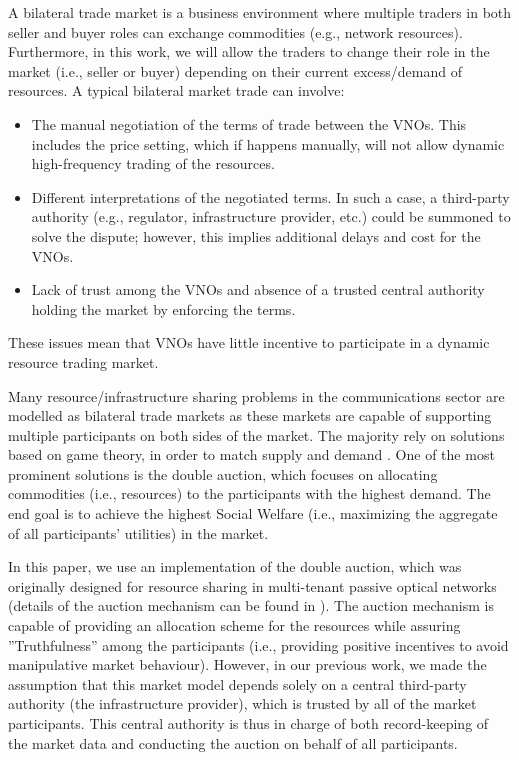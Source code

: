 \documentclass[conference]{IEEEtran}
\begin{document}
A bilateral trade market is a business environment where multiple traders in both seller and buyer roles can exchange commodities (e.g., network resources). Furthermore, in this work, we will allow the traders to change their role in the market (i.e., seller or buyer) depending on their current excess/demand of resources.
A typical bilateral market trade can involve: 
\begin{itemize}
    \item The manual negotiation of the terms of trade between the VNOs. This includes the price setting, which if happens manually, will not allow dynamic high-frequency trading of the resources.
    \item Different interpretations of the negotiated terms. In such a case, a third-party authority (e.g., regulator, infrastructure provider, etc.) could be summoned to solve the dispute; however, this implies additional delays and cost for the VNOs.
    \item Lack of trust among the VNOs and absence of a trusted central authority holding the market by enforcing the terms. 
\end{itemize}

These issues mean that VNOs have little incentive to participate in a dynamic resource trading market.


Many resource/infrastructure sharing problems in the communications sector are modelled as bilateral trade markets as these markets are capable of supporting multiple participants on both sides of the market. The majority rely on solutions based on game theory, in order to match supply and demand \cite{8542782,8665886,8664672,8395445,8488596}. One of the most prominent solutions is the double auction, which focuses on allocating commodities (i.e., resources) to the participants with the highest demand. The end goal is to achieve the highest Social Welfare (i.e., maximizing the aggregate of all participants' utilities) in the market. 

In this paper, we use an implementation of the double auction, which was originally designed for resource sharing in multi-tenant passive optical networks (details of the auction mechanism can be found in \cite{8488596}). The auction mechanism is capable of providing an allocation scheme for the resources while assuring ''Truthfulness'' among the participants (i.e., providing positive incentives to avoid manipulative market behaviour). However, in our previous work, we made the assumption that this market model depends solely on a central third-party authority (the infrastructure provider), which is trusted by all of the market participants. This central authority is thus in charge of both record-keeping of the market data and conducting the auction on behalf of all participants. 
\end{document}
